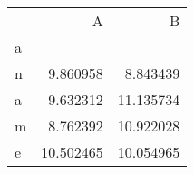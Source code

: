 \begin{tabular}{lrr}
\toprule
{} &          A &          B \\
a &            &            \\
\midrule
n &   9.860958 &   8.843439 \\
a &   9.632312 &  11.135734 \\
m &   8.762392 &  10.922028 \\
e &  10.502465 &  10.054965 \\
\bottomrule
\end{tabular}
